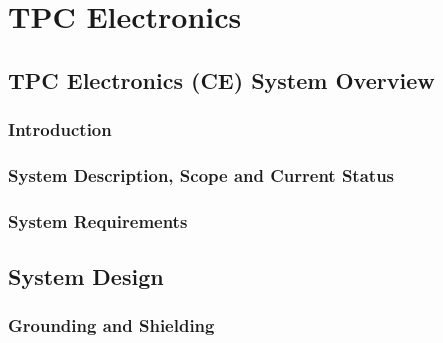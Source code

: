 \chapter{TPC Electronics}
\label{ch:fdsp-tpc-elec}


\section{TPC Electronics (CE) System Overview}
\label{sec:fdsp-tpc-elec-ov}


\subsection{Introduction}
\label{sec:fdsp-tpc-elec-ov-intro}


\subsection{System Description, Scope and Current Status}
\label{sec:fdsp-tpc-elec-ov-scope}


\subsection{System Requirements}
\label{sec:fdsp-tpc-elec-ov-req}



\section{System Design}
\label{sec:fdsp-tpc-elec-design}


\subsection{Grounding and Shielding}
\label{sec:fdsp-tpc-elec-design-ground}


